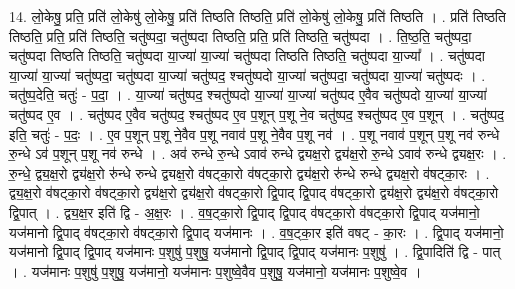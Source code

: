 \documentclass[17pt]{extarticle}
\begin{document}
14. लो॒केषु॒ प्रति॒ प्रति॑ लो॒केषु॑ लो॒केषु॒ प्रति॑ तिष्ठति तिष्ठति॒ प्रति॑ लो॒केषु॑ लो॒केषु॒ प्रति॑ तिष्ठति । . प्रति॑ तिष्ठति तिष्ठति॒ प्रति॒ प्रति॑ तिष्ठति॒ चतु॑ष्पदा॒ चतु॑ष्पदा तिष्ठति॒ प्रति॒ प्रति॑ तिष्ठति॒ चतु॑ष्पदा । . ति॒ष्ठ॒ति॒ चतु॑ष्पदा॒ चतु॑ष्पदा तिष्ठति तिष्ठति॒ चतु॑ष्पदा या॒ज्या॑ या॒ज्या॑ चतु॑ष्पदा तिष्ठति तिष्ठति॒ चतु॑ष्पदा या॒ज्या᳚ । . चतु॑ष्पदा या॒ज्या॑ या॒ज्या॑ चतु॑ष्पदा॒ चतु॑ष्पदा या॒ज्या॑ चतु॑ष्पद॒ श्चतु॑ष्पदो या॒ज्या॑ चतु॑ष्पदा॒ चतु॑ष्पदा या॒ज्या॑ चतु॑ष्पदः । . चतु॑ष्प॒देति॒ चतुः॑ - प॒दा॒ । . या॒ज्या॑ चतु॑ष्पद॒ श्चतु॑ष्पदो या॒ज्या॑ या॒ज्या॑ चतु॑ष्पद ए॒वैव चतु॑ष्पदो या॒ज्या॑ या॒ज्या॑ चतु॑ष्पद ए॒व । . चतु॑ष्पद ए॒वैव चतु॑ष्पद॒ श्चतु॑ष्पद ए॒व प॒शून् प॒शू ने॒व चतु॑ष्पद॒ श्चतु॑ष्पद ए॒व प॒शून् । . चतु॑ष्पद॒ इति॒ चतुः॑ - प॒दः॒ । . ए॒व प॒शून् प॒शू ने॒वैव प॒शू नवाव॑ प॒शू ने॒वैव प॒शू नव॑ । . प॒शू नवाव॑ प॒शून् प॒शू नव॑ रुन्धे रु॒न्धे ऽव॑ प॒शून् प॒शू नव॑ रुन्धे । . अव॑ रुन्धे रु॒न्धे ऽवाव॑ रुन्धे द्व्यक्ष॒रो द्व्य॑क्ष॒रो रु॒न्धे ऽवाव॑ रुन्धे द्व्यक्ष॒रः । . रु॒न्धे॒ द्व्य॒क्ष॒रो द्व्य॑क्ष॒रो रु॑न्धे रुन्धे द्व्यक्ष॒रो व॑षट्का॒रो व॑षट्का॒रो द्व्य॑क्ष॒रो रु॑न्धे रुन्धे द्व्यक्ष॒रो व॑षट्का॒रः । . द्व्य॒क्ष॒रो व॑षट्का॒रो व॑षट्का॒रो द्व्य॑क्ष॒रो द्व्य॑क्ष॒रो व॑षट्का॒रो द्वि॒पाद् द्वि॒पाद् व॑षट्का॒रो द्व्य॑क्ष॒रो द्व्य॑क्ष॒रो व॑षट्का॒रो द्वि॒पात् । . द्व्य॒क्ष॒र इति॑ द्वि - अ॒क्ष॒रः । . व॒ष॒ट्का॒रो द्वि॒पाद् द्वि॒पाद् व॑षट्का॒रो व॑षट्का॒रो द्वि॒पाद् यज॑मानो॒ यज॑मानो द्वि॒पाद् व॑षट्का॒रो व॑षट्का॒रो द्वि॒पाद् यज॑मानः । . व॒ष॒ट्का॒र इति॑ वषट् - का॒रः । . द्वि॒पाद् यज॑मानो॒ यज॑मानो द्वि॒पाद् द्वि॒पाद् यज॑मानः प॒शुषु॑ प॒शुषु॒ यज॑मानो द्वि॒पाद् द्वि॒पाद् यज॑मानः प॒शुषु॑ । . द्वि॒पादिति॑ द्वि - पात् । . यज॑मानः प॒शुषु॑ प॒शुषु॒ यज॑मानो॒ यज॑मानः प॒शुष्वे॒वैव प॒शुषु॒ यज॑मानो॒ यज॑मानः प॒शुष्वे॒व । \newline
\end{document}
